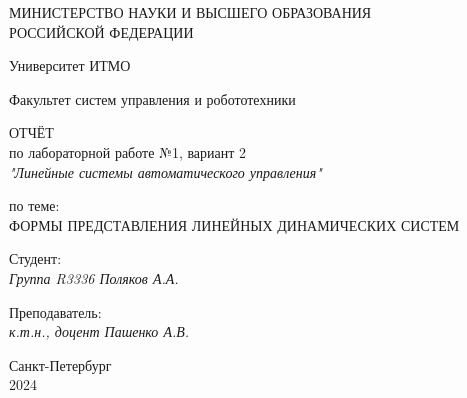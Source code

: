 \thispagestyle{empty}

\begin{center}
    МИНИСТЕРСТВО НАУКИ И ВЫСШЕГО ОБРАЗОВАНИЯ \\ РОССИЙСКОЙ ФЕДЕРАЦИИ

    \vspace{20pt}

    Университет ИТМО

    \vspace{20pt}

    Факультет систем управления и робототехники
\end{center}

\vfill

\begin{center}
    ОТЧЁТ \\  
    по лабораторной работе №1, вариант 2 \\
    \textit{"Линейные системы автоматического управления"}

    \vspace{20pt}

    по теме: \\
    \uppercase{Формы представления линейных динамических систем}
\end{center}

\vfill

\noindent Студент: \\
\textit{Группа R3336 \hfill Поляков А.А.}


    \vspace{20pt}

    \noindent Преподаватель: \\
    \textit{к.т.н., доцент \hfill Пашенко А.В.}

\vfill

\begin{center}
    Санкт-Петербург \\ 2024
\end{center}